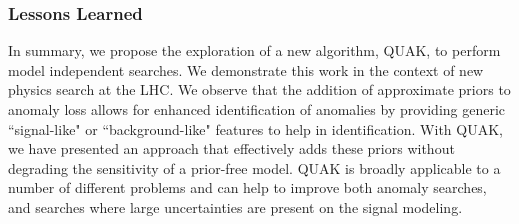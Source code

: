 \documentclass[a4paper,11pt]{article}
\begin{document}
\begin{comment}
From these plots, we can make substantive conclusions about the design and future use of QUAK. First of all, we observe that high-dimensional QUAK spaces are highly effective provided a proxy signal prior is used that is similar to the potential anomalous signal. Furthermore, this signal can be concatenated with other incorrect signals. Finally, we observe that the latent space is not as effective as the N-dimensional loss space. We interpret this to mean that the individual VAE captures more information about a signal digit than a combined training intended to resolve all digits at once. 

\begin{figure}[htbp]
\centering
\texttt{[image: figures/inputs\_LHCO2020PaperContribution2\_images\_vae\_mnist.png]}
\texttt{[image: figures/inputs\_LHCO2020PaperContribution2\_images\_diltued\_proxy.png]}
\texttt{[image: figures/inputs\_LHCO2020PaperContribution2\_images\_latent\_v\_Quak.png]}
\caption{Performance in separating the digit 5 from 9 for a fully supervised network (full) with (left) (orange) QUAK 1D, (green) the space of digits 0-8 as input to small MLP trained with 5 against 9,(red) the space of 5 and 9 trained with a small MLP to separate 5 and 9, (purple) the space of digits 0-8 with a linear discriminant(LDA) using 7 as a signal proxy; (center) A linear discriminant on the space of digits 0-8 using a proxy signal that is X\% 7 and the opposite percent 0; all corresponds to all digits (right) with an N-dimensional latent space from the VAE trained with a supervised network of 5 vs Signal(9)/Proxy(7) compared to QUAK space using an LDA with either Signal(9)/Proxy(7). }
\label{fig:mnist}
\end{figure}
\end{comment}
 
\subsubsection{Lessons Learned}
\label{sec:lessons}
In summary, we propose the exploration of a new algorithm, QUAK, to perform model independent searches. We demonstrate this work in the context of new physics search at the LHC. We observe that the addition of approximate priors to anomaly loss allows for enhanced identification of anomalies by providing generic ``signal-like" or ``background-like" features to help in identification. With QUAK, we have presented an approach that effectively adds these priors without degrading the sensitivity of a prior-free model. QUAK is broadly applicable to a number of different problems and can help to improve both anomaly searches, and searches where large uncertainties are present on the signal modeling.  
\end{document}
